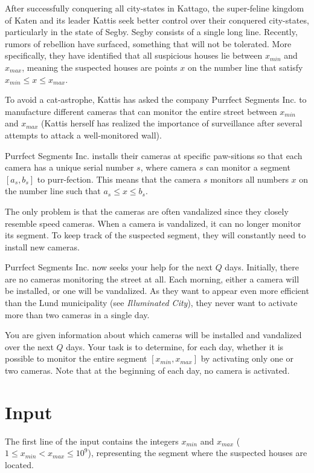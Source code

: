 
\noindent
After successfully conquering all city-states in Kattago, the super-feline kingdom of 
Katen and its leader Kattis seek better control over their conquered city-states, particularly in the state of Segby. 
Segby consists of a single long line. Recently, rumors of rebellion have surfaced, 
something that will not be tolerated. More specifically, they have identified that all suspicious houses 
lie between $x_{min}$ and $x_{max}$, meaning the suspected houses are points $x$ on the number line that 
satisfy $x_{min} \le x \le x_{max}$.


To avoid a cat-astrophe, Kattis has asked the company Purrfect Segments Inc. to manufacture 
different cameras that can monitor the entire street between $x_{min}$ and $x_{max}$ 
(Kattis herself has realized the importance of surveillance after several attempts to attack a well-monitored wall).

Purrfect Segments Inc. installs their cameras at specific paw-sitions so that each camera 
has a unique serial number $s$, where camera $s$ can monitor a segment $[a_s,b_s]$ to purr-fection. 
This means that the camera $s$ monitors all numbers $x$ on the number line such that $a_s \le x \le b_s$.

The only problem is that the cameras are often vandalized since they closely resemble speed cameras. 
When a camera is vandalized, it can no longer monitor its segment. To keep track of the suspected segment, 
they will constantly need to install new cameras.

Purrfect Segments Inc. now seeks your help for the next $Q$ days. Initially, there are no cameras 
monitoring the street at all. Each morning, either a camera will be installed, or one will be vandalized. 
As they want to appear even more efficient than the Lund municipality (see \textit{Illuminated City}), 
they never want to activate more than two cameras in a single day.

You are given information about which cameras will be installed and vandalized over the next $Q$ days. 
Your task is to determine, for each day, whether it is possible to monitor the entire segment $[x_{min}, x_{max}]$ 
by activating only one or two cameras. Note that at the beginning of each day, no camera is activated.


\section*{Input}
The first line of the input contains the integers $x_{min}$ and $x_{max}$ ($1 \leq x_{min} < x_{max} \leq 10^9$), 
representing the segment where the suspected houses are located.


